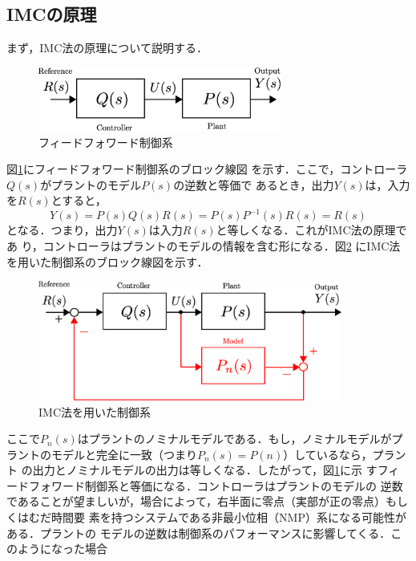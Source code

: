 \documentclass[a4paper,12pt]{jarticle}
\begin{document}
\subsection{IMCの原理}
まず，IMC法の原理について説明する．
%
\begin{figure}[bp]
 \begin{center}
  \includegraphics[width = 80mm]{fig/FF.eps}
 \end{center}
 \caption{フィードフォワード制御系}
 \label{fig:ff}
\end{figure}
%
図\ref{fig:ff}にフィードフォワード制御系のブロック線図
を示す．ここで，コントローラ$Q(s)$がプラントのモデル$P(s)$の逆数と等価で
あるとき，出力$Y(s)$は，入力を$R(s)$とすると，
\begin{equation}
Y(s) = P(s)Q(s)R(s) = P(s)P^{-1}(s)R(s) =R(s)
\end{equation}
となる．つまり，出力$Y(s)$は入力$R(s)$と等しくなる．これがIMC法の原理であ
り，コントローラはプラントのモデルの情報を含む形になる．図\ref{fig:IMC}
にIMC法を用いた制御系のブロック線図を示す．
%
\begin{figure}[tbp]
 \begin{center}
  \includegraphics[width = 100mm]{fig/IMC.eps}
 \end{center}
 \caption{IMC法を用いた制御系}
 \label{fig:IMC}
\end{figure}
%
ここで$P_n(s)$はプラントのノミナルモデルである．もし，ノミナルモデルがプ
ラントのモデルと完全に一致（つまり$P_n(s)=P(n)$）しているなら，プラント
の出力とノミナルモデルの出力は等しくなる．したがって，図\ref{fig:ff}に示
すフィードフォワード制御系と等価になる．コントローラはプラントのモデルの
逆数であることが望ましいが，場合によって，右半面に零点（実部が正の零点）もしくはむだ時間要
素を持つシステムである非最小位相（NMP）系になる可能性がある．プラントの
モデルの逆数は制御系のパフォーマンスに影響してくる．このようになった場合
\end{document}
